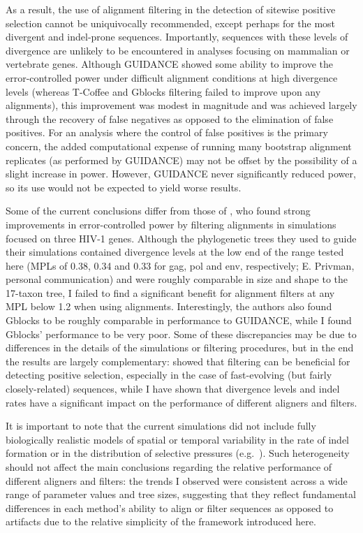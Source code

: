 As a result, the use of alignment filtering in the detection of
sitewise positive selection cannot be uniquivocally recommended,
except perhaps for the most divergent and indel-prone
sequences. Importantly, sequences with these levels of divergence are
unlikely to be encountered in analyses focusing on mammalian or
vertebrate genes. Although GUIDANCE showed some ability to improve the
error-controlled power under difficult alignment conditions at high
divergence levels (whereas T-Coffee and Gblocks filtering failed to
improve upon any \prankc alignments), this improvement was modest in
magnitude and was achieved largely through the recovery of false
negatives as opposed to the elimination of false positives. For an
analysis where the control of false positives is the primary concern,
the added computational expense of running many bootstrap alignment
replicates (as performed by GUIDANCE) may not be offset by the
possibility of a slight increase in power. However, GUIDANCE never
significantly reduced power, so its use would not be expected to yield
worse results.

Some of the current conclusions differ from those of
\citet{Privman2011Improving}, who found strong improvements in
error-controlled power by filtering alignments in simulations focused
on three HIV-1 genes. Although the phylogenetic trees they used to
guide their simulations contained divergence levels at the low end of
the range tested here (MPLs of 0.38, 0.34 and 0.33 for gag, pol and
env, respectively; E. Privman, personal communication) and were
roughly comparable in size and shape to the 17-taxon tree, I failed to
find a significant benefit for alignment filters at any MPL below 1.2
when using \prankc alignments. Interestingly, the authors also found
Gblocks to be roughly comparable in performance to GUIDANCE, while I
found Gblocks' performance to be very poor. Some of these
discrepancies may be due to differences in the details of the
simulations or filtering procedures, but in the end the results are
largely complementary: \citet{Privman2011Improving} showed that
filtering can be beneficial for detecting positive selection,
especially in the case of fast-evolving (but fairly closely-related)
sequences, while I have shown that divergence levels and indel rates
have a significant impact on the performance of different aligners and
filters.

It is important to note that the current simulations did not include
fully biologically realistic models of spatial or temporal variability
in the rate of indel formation or in the distribution of selective
pressures (e.g.\, \citet{Whelan2008}). Such heterogeneity should not
affect the main conclusions regarding the relative performance of
different aligners and filters: the trends I observed were consistent
across a wide range of parameter values and tree sizes, suggesting
that they reflect fundamental differences in each method's ability to
align or filter sequences as opposed to artifacts due to the relative
simplicity of the framework introduced here.

